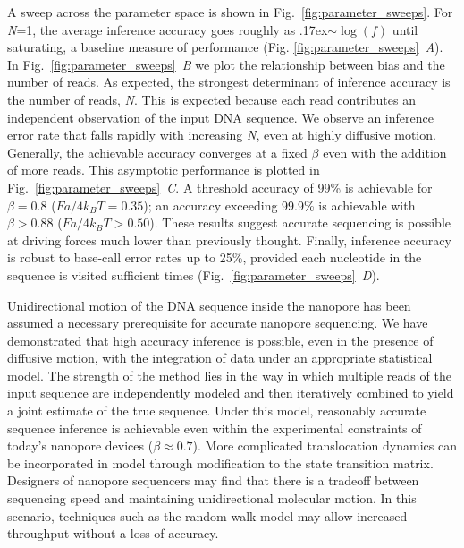 \documentclass{biophys_letter}
\newcommand{\bias}{\beta}
\newcommand{\kje}[1]{\textcolor{BurntOrange}{#1}}
\begin{document}
A sweep across the parameter space is shown in Fig.~\ref{fig:parameter_sweeps}.
For \emph{N}=1, the average inference accuracy goes roughly as \kje{{\raise.17ex\hbox{$\scriptstyle\sim$}}$\log{(f)}$} until saturating, a baseline measure of performance (Fig. \ref{fig:parameter_sweeps}\emph{~A}).
In Fig.~\ref{fig:parameter_sweeps}\emph{~B} we plot the relationship between bias and the number of reads.
As expected, the strongest determinant of inference accuracy is the number of reads, \emph{N}.
This is expected because each read contributes an independent observation of the input DNA sequence.
We observe an inference error rate that falls rapidly with increasing \emph{N}, even at highly diffusive motion.
Generally, the achievable accuracy converges at a fixed $\bias$ even with the addition of more reads.
This asymptotic performance is plotted in Fig.~\ref{fig:parameter_sweeps}\emph{~C}.
A threshold accuracy of 99\% is achievable for $\bias=0.8$ ($Fa/4k_{B}T=0.35$); an accuracy exceeding 99.9\% is achievable with $\bias>0.88$ ($Fa/4k_{B}T>0.50$).
These results suggest accurate sequencing is possible at driving forces much lower than previously thought.
Finally, inference accuracy is \kje{robust to base-call error rates up to 25\%}, provided each nucleotide in the sequence is visited sufficient times (Fig.~\ref{fig:parameter_sweeps}\emph{~D}).

\kje{Unidirectional} motion of the DNA sequence inside the nanopore has been assumed a necessary prerequisite for accurate nanopore sequencing.
We have demonstrated that high accuracy inference is possible, even in the presence of diffusive motion, with the integration of data under an appropriate statistical model.
The strength of the method lies in the way in which multiple reads of the input sequence are independently modeled and then iteratively combined to yield a joint estimate of the true sequence.
Under this model, reasonably accurate sequence inference is achievable even within the experimental constraints of today's nanopore devices ($\bias\approx 0.7$).
More complicated translocation dynamics can be incorporated in model through modification to the state transition matrix.
Designers of nanopore sequencers may find that there is a tradeoff between sequencing speed and maintaining unidirectional molecular motion.
In this scenario, techniques such as the random walk model may allow increased throughput without a loss of accuracy.
\end{document}
